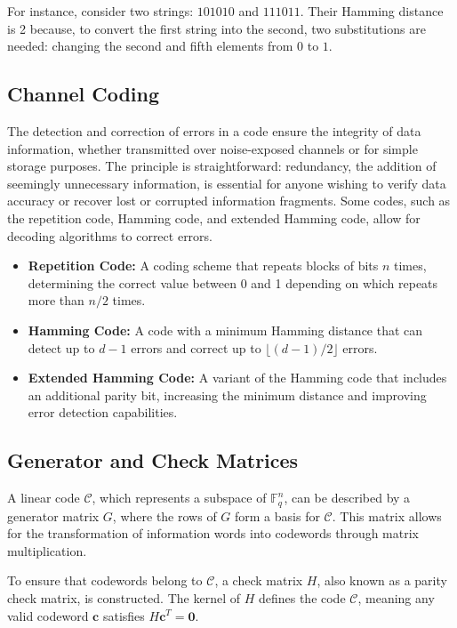 For instance, consider two strings: $101010$ and $111011$. Their Hamming distance is 2 because, to convert the first string into the second, two substitutions are needed: changing the second and fifth elements from $0$ to $1$.

\subsection{Channel Coding}
The detection and correction of errors in a code ensure the integrity of data information, whether transmitted over noise-exposed channels or for simple storage purposes. The principle is straightforward: redundancy, the addition of seemingly unnecessary information, is essential for anyone wishing to verify data accuracy or recover lost or corrupted information fragments. Some codes, such as the repetition code, Hamming code, and extended Hamming code, allow for decoding algorithms to correct errors.

\begin{itemize}
    \item \textbf{Repetition Code:} A coding scheme that repeats blocks of bits $n$ times, determining the correct value between 0 and 1 depending on which repeats more than $n/2$ times.
    \item \textbf{Hamming Code:} A code with a minimum Hamming distance that can detect up to $d - 1$ errors and correct up to $\lfloor (d-1)/2 \rfloor$ errors.
    \item \textbf{Extended Hamming Code:} A variant of the Hamming code that includes an additional parity bit, increasing the minimum distance and improving error detection capabilities.
\end{itemize}

\subsection{Generator and Check Matrices}
A linear code \(\mathcal{C}\), which represents a subspace of \(\mathbb{F}_q^n\), can be described by a generator matrix \(G\), where the rows of \(G\) form a basis for \(\mathcal{C}\). This matrix allows for the transformation of information words into codewords through matrix multiplication.

To ensure that codewords belong to \(\mathcal{C}\), a check matrix \(H\), also known as a parity check matrix, is constructed. The kernel of \(H\) defines the code \(\mathcal{C}\), meaning any valid codeword \( \mathbf{c} \) satisfies \( H\mathbf{c}^T = \mathbf{0} \).

